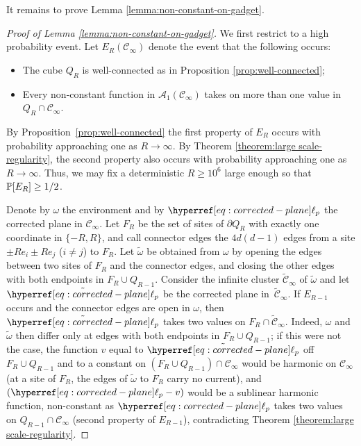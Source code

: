 \documentclass[12pt]{amsart}
\numberwithin{equation}{section}
\begin{document}
	It remains to prove Lemma \ref{lemma:non-constant-on-gadget}.
	
	
	
	\begin{proof}[Proof of Lemma \ref{lemma:non-constant-on-gadget}]
		We first restrict to a high probability event. Let $E_R(\mathscr{C}_{\infty})$ denote the event that the following occurs: 
		\begin{itemize}
			\item The cube $Q_R$ is well-connected as in Proposition \ref{prop:well-connected};
			\item Every non-constant function in $\mathcal{A}_1(\mathscr{C}_{\infty})$ takes on more than one value in $Q_R \cap \mathscr{C}_{\infty}$.  
		\end{itemize}
		By Proposition~\ref{prop:well-connected} the first property of $E_R$ occurs with probability approaching one as $R \to \infty$. By Theorem \ref{theorem:large scale-regularity}, the second property also occurs with probability approaching one as $R \to \infty$. Thus, we may fix a deterministic $R \geq 10^6$ large enough so that $\P[E_R] \geq 1/2$. 
		
		Denote by $\omega$ the environment and by $\ellp{p}$ the corrected plane in $\mathscr{C}_{\infty}$. Let $F_R$ be the set of sites of $\partial Q_R$ with exactly one coordinate in $\{-R, R\}$, and call connector edges the $4d(d-1)$ edges from a site $\pm R e_i \pm R e_j$ ($i \neq j$) to $F_R$. Let $\tilde \omega$ be obtained from $\omega$ by opening the edges between two sites of $F_R$ and the connector edges, and closing the other edges with both endpoints in $F_R \cup Q_{R-1}$. Consider the infinite cluster $\mathscr{\tilde C}_{\infty}$ of $\tilde \omega$
		and let $\tilde{\ellp{p}}$ be the corrected plane in~$\mathscr{\tilde C}_{\infty}$. If $E_{R-1}$ occurs and the connector edges are open in $\omega$, then $\tilde{\ellp{p}}$ takes two values on $F_R \cap \mathscr{\tilde C}_{\infty}$. Indeed, $\omega$ and $\tilde \omega$ then differ only at edges with both endpoints in $F_R \cup Q_{R-1}$; if this were not the case, 
		the function $v$ equal to $\tilde{\ellp{p}}$ off $F_R \cup Q_{R-1}$ and to a constant on $(F_R \cup Q_{R-1}) \cap \mathscr{C}_{\infty}$ would be harmonic on $\mathscr{C}_{\infty}$ (at a site of $F_R$, the edges of $\tilde \omega$ to $F_R$ carry no current), and $(\ellp{p} - v)$ would be a sublinear harmonic function, non-constant as $\ellp{p}$ takes two values on $Q_{R-1} \cap \mathscr{C}_{\infty}$ (second property of $E_{R-1}$), contradicting 
		Theorem \ref{theorem:large scale-regularity}. 
		

\end{proof}
\end{document}
